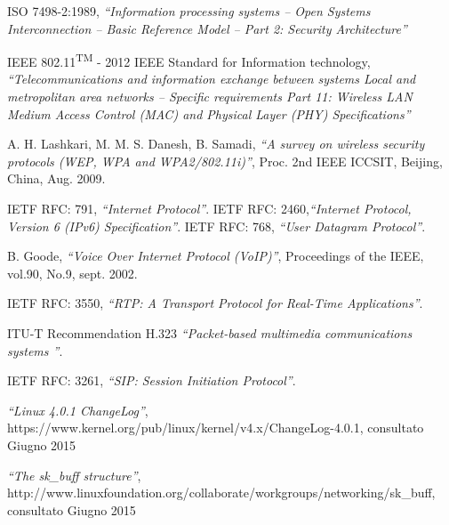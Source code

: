 \begin{thebibliography}{90}   
\rhead[\fancyplain{}{\bfseries \leftmark}]{\fancyplain{}{\bfseries
\thepage}}


 ISO 7498-2:1989, \textit{``Information processing systems -- Open Systems Interconnection -- Basic Reference Model -- Part 2: Security Architecture''}

 IEEE 802.11\textsuperscript{TM} - 2012 IEEE Standard for Information technology, \textit{``Telecommunications and information exchange between systems Local and metropolitan area networks -- Specific requirements Part 11: Wireless LAN Medium Access Control (MAC) and Physical Layer (PHY) Specifications''}

 A. H. Lashkari, M. M. S. Danesh, B. Samadi, \textit{``A survey on wireless security protocols (WEP, WPA and WPA2/802.11i)''}, Proc. 2nd IEEE ICCSIT, Beijing, China, Aug. 2009.

 IETF RFC: 791, \textit{``Internet Protocol''}.
 IETF RFC: 2460,\textit{``Internet Protocol, Version 6 (IPv6) Specification''}.
 IETF RFC: 768, \textit{``User Datagram Protocol''}.

 B. Goode, \textit{``Voice Over Internet Protocol (VoIP)''}, Proceedings of the IEEE, vol.90, No.9, sept. 2002.

 IETF RFC: 3550, \textit{``RTP: A Transport Protocol for Real-Time Applications''}.

 ITU-T Recommendation H.323 \textit{``Packet-based multimedia communications systems ''}.

 IETF RFC: 3261, \textit{``SIP: Session Initiation Protocol''}.


 \textit{``Linux 4.0.1 ChangeLog''}, https://www.kernel.org/pub/linux/kernel/v4.x/ChangeLog-4.0.1, consultato Giugno 2015

 \textit{``The sk\_buff structure''}, http://www.linuxfoundation.org/collaborate/workgroups/networking/sk\_buff, consultato Giugno 2015



\end{thebibliography}
